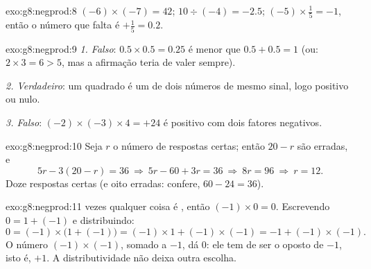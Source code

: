\begin{solution}{exo:g8:negprod:8}
$(-6) \times (-7) = 42$; \quad
$10 \div (-4) = -2.5$; \quad
$(-5) \times \frac15 = -1$, então o número que falta é
$+\frac15 = 0.2$.
\end{solution}

\begin{solution}{exo:g8:negprod:9}
\emph{1. Falso}: $0.5 \times 0.5 = 0.25$ é menor que
$0.5 + 0.5 = 1$ (ou: $2 \times 3 = 6 > 5$, mas a afirmação teria de
valer sempre).

\emph{2. Verdadeiro}: um quadrado é um  de dois números de mesmo
sinal, logo positivo ou nulo.

\emph{3. Falso}: $(-2) \times (-3) \times 4 = +24$ é positivo com dois
fatores negativos.
\end{solution}

\begin{solution}{exo:g8:negprod:10}
Seja $r$ o número de respostas certas; então $20 - r$ são erradas, e
\[
5r - 3(20 - r) = 36
\ \Longrightarrow\
5r - 60 + 3r = 36
\ \Longrightarrow\
8r = 96
\ \Longrightarrow\
r = 12 .
\]
Doze respostas certas (e oito erradas: confere, $60 - 24 = 36$).
\end{solution}

\begin{solution}{exo:g8:negprod:11}
 vezes qualquer coisa é , então $(-1) \times 0 = 0$. Escrevendo
$0 = 1 + (-1)$ e distribuindo:
\[
0 = (-1) \times \bigl(1 + (-1)\bigr)
= (-1) \times 1 + (-1) \times (-1)
= -1 + (-1) \times (-1).
\]
O número $(-1) \times (-1)$, somado a $-1$, dá $0$: ele tem de ser o
oposto de $-1$, isto é, $+1$. A distributividade não deixa outra
escolha.
\end{solution}

